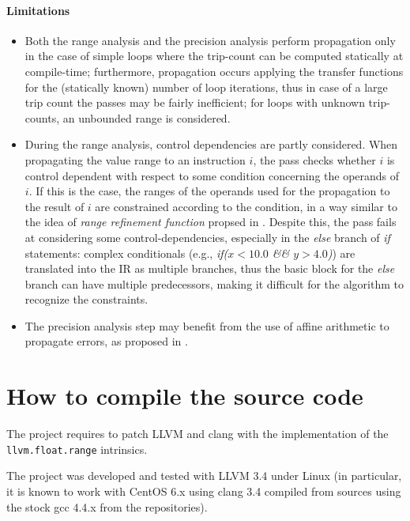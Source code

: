 \documentclass[9pt,twocolumn,a4paper]{scrartcl}
\begin{document}
\paragraph{Limitations}
\begin{itemize}
\item Both the range analysis and the precision analysis
perform propagation only in the case of simple loops where the trip-count can
be computed statically at compile-time; furthermore, propagation occurs
applying the transfer functions for the (statically known) number of loop
iterations, thus in case of a large trip count the passes may be fairly
inefficient; for loops with unknown trip-counts, an unbounded range is
considered.
\item During the range analysis, control dependencies are partly considered. When
propagating the value range to an instruction $i$, the pass checks whether $i$
is control dependent with respect to some condition concerning the operands of
$i$. If this is the case, the ranges of the operands used for the propagation
to the result of $i$ are constrained according to the condition, in a way
similar to the idea of \emph{range refinement function} propsed in
\cite{stephenson-2000-pldi}. Despite this, the pass fails at considering some
control-dependencies, especially in the \emph{else} branch of \emph{if}
statements: complex conditionals (e.g., \emph{if($x < 10.0$ \&\& $y > 4.0$)}) are
translated into the \ac{IR} as multiple branches, thus the basic block for the
\emph{else} branch can have multiple predecessors, making it difficult for the
algorithm to recognize the constraints.
\item The precision analysis step may benefit from the use of affine arithmetic to
propagate errors, as proposed in \cite{lee-2006-tcad,fanc-2003-iccad}.
\end{itemize}

\section{How to compile the source code}

The project requires to patch LLVM and clang with the implementation of the
\verb|llvm.float.range| intrinsics.

The project was developed and tested with LLVM 3.4 under Linux (in particular,
it is known to work with CentOS 6.x using clang 3.4 compiled from sources using
the stock gcc 4.4.x from the repositories).
\end{document}
